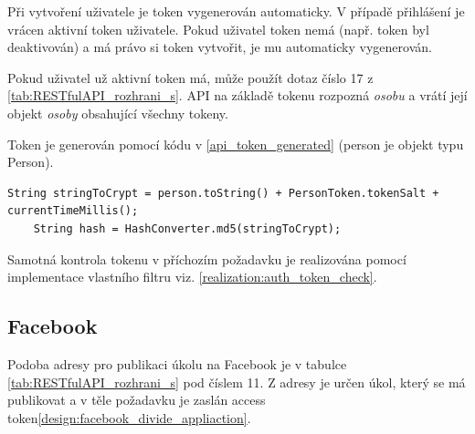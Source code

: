 \documentclass[thesis=B,czech]{FITthesis}[2012/06/26]
\begin{document}
Při vytvoření uživatele je token vygenerován automaticky. V případě přihlášení je vrácen aktivní token uživatele. Pokud uživatel token nemá (např. token byl deaktivován) a má právo si token vytvořit, je mu automaticky vygenerován.

Pokud uživatel už aktivní token má, může použít dotaz číslo 17 z \ref{tab:RESTfulAPI_rozhrani_s}. API na základě tokenu rozpozná \textit{osobu} a vrátí její objekt \textit{osoby} obsahující všechny tokeny. 

Token je generován pomocí kódu v \ref{api_token_generated} (person je objekt typu Person).

\begin{lstlisting}[label=api_token_generated,caption=Generování uživatelského tokenu]
	String stringToCrypt = person.toString() + PersonToken.tokenSalt + currentTimeMillis();
	String hash = HashConverter.md5(stringToCrypt);
\end{lstlisting}

Samotná kontrola tokenu v příchozím požadavku je realizována pomocí implementace vlastního filtru\cite{realization_spring_filter} viz. \ref{realization:auth_token_check}. 



\subsection{Facebook}
\label{realization:restapi_facebook}

Podoba adresy pro publikaci úkolu na Facebook je v tabulce \ref{tab:RESTfulAPI_rozhrani_s} pod číslem 11. Z adresy je určen úkol, který se má publikovat a v těle požadavku je zaslán access token\ref{design:facebook_divide_appliaction}. 
\end{document}
